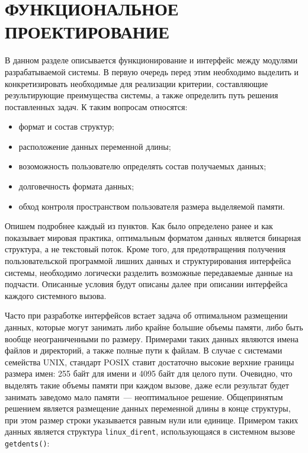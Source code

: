 \section{ФУНКЦИОНАЛЬНОЕ ПРОЕКТИРОВАНИЕ}
\label{sec:func}

В данном разделе описывается функционирование и интерфейс между модулями
разрабатываемой системы. В первую очередь перед этим необходимо выделить и
конкретизировать необходимые для реализации критерии, составляющие
результирующие преимущества системы, а также определить путь решения
поставленных задач. К таким вопросам относятся:

\begin{itemize}
\item формат и состав структур;
\item расположение данных переменной длины;
\item возоможность пользователю определять состав получаемых данных;
\item долговечность формата данных;
\item обход контроля пространством пользователя размера выделяемой памяти.
\end{itemize}

Опишем подробнее каждый из пунктов. Как было определено ранее и как показывает
мировая практика, оптимальным форматом данных является бинарная структура, а не
текстовый поток. Кроме того, для предотвращения получения пользовательской
программой лишних данных и структурирования интерфейса системы, необходимо
логически разделить возможные передаваемые данные на подчасти. Описанные условия
будут описаны далее при описании интерфейса каждого системного вызова.

Часто при разработке интерфейсов встает задача об отпимальном размещении данных,
которые могут занимать либо крайне большие объемы памяти, либо быть вообще
неограниченными по размеру. Примерами таких данных являются имена файлов и
директорий, а также полные пути к файлам. В случае с системами семейства UNIX,
стандарт POSIX ставит достаточно высокие верхние границы размера имен: 255 байт
для имени и 4095 байт для целого пути. Очевидно, что выделять такие объемы
памяти при каждом вызове, даже если результат будет занимать заведомо мало
памяти~--- неоптимальное решение. Общепринятым решением является размещение
данных переменной длины в конце структуры, при этом размер строки указывается
равным нули или единице. Примером таких данных является структура
\texttt{linux\_dirent}, использующаяся в системном вызове \texttt{getdents()}:


